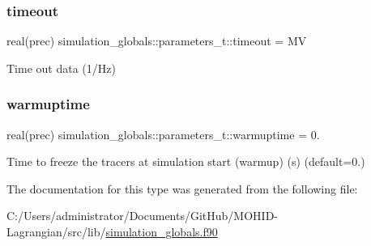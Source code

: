 \subsubsection{\texorpdfstring{timeout}{timeout}}
{\footnotesize\ttfamily real(prec) simulation\+\_\+globals\+::parameters\+\_\+t\+::timeout = MV\hspace{0.3cm}{\ttfamily [private]}}



Time out data (1/\+Hz) 

\mbox{\label{structsimulation__globals_1_1parameters__t_ad187b9779c3a5c156824c359eef4c52e}} 
\subsubsection{\texorpdfstring{warmuptime}{warmuptime}}
{\footnotesize\ttfamily real(prec) simulation\+\_\+globals\+::parameters\+\_\+t\+::warmuptime = 0.\hspace{0.3cm}{\ttfamily [private]}}



Time to freeze the tracers at simulation start (warmup) (s) (default=0.) 



The documentation for this type was generated from the following file\+:\begin{DoxyCompactItemize}
\item 
C\+:/\+Users/administrator/\+Documents/\+Git\+Hub/\+M\+O\+H\+I\+D-\/\+Lagrangian/src/lib/\hyperlink{simulation__globals_8f90}{simulation\+\_\+globals.\+f90}\end{DoxyCompactItemize}
